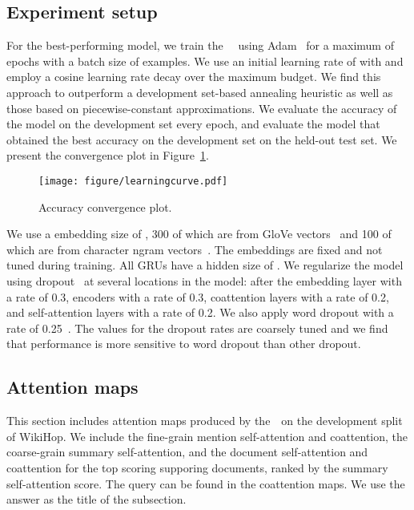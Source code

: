 \documentclass{article} \usepackage{iclr2019_conference,times}
\begin{document}
\subsection{Experiment setup}
\label{appendix:setup}
For the best-performing model, we train the ~\modelnameshort~using Adam~\citep{Kingma2015AdamAM} for a maximum of  epochs with a batch size of  examples. 
We use an initial learning rate of  with  and employ a cosine learning rate decay \cite{Loshchilov2017SGDR} over the maximum budget.
We find this approach to outperform a development set-based annealing heuristic as well as those based on piecewise-constant approximations.
We evaluate the accuracy of the model on the development set every epoch, and evaluate the model that obtained the best accuracy on the development set on the held-out test set.
We present the convergence plot in Figure~\ref{eq:learningcurve}. 

\begin{figure}[!h]
\centering
  \texttt{[image: figure/learningcurve.pdf]}
  \caption{Accuracy convergence plot.}
  \label{eq:learningcurve}
\end{figure}


We use a embedding size of , 300 of which are from GloVe vectors~\citep{Pennington2014GloveGV} and 100 of which are from character ngram vectors~\citep{Hashimoto2017AJM}.
The embeddings are fixed and not tuned during training.
All GRUs have a hidden size of .
We regularize the model using dropout~\citep{JMLR:v15:srivastava14a} at several locations in the model: after the embedding layer with a rate of 0.3, encoders with a rate of 0.3, coattention layers with a rate of 0.2, and self-attention layers with a rate of 0.2.
We also apply word dropout with a rate of 0.25~\citep{zhang2017position,zhong2018global}.
The values for the dropout rates are coarsely tuned and we find that performance is more sensitive to word dropout than other dropout. 





\subsection{Attention maps}
\label{appendix:attentionmap}
This section includes attention maps produced by the~\modelnameshort~on the development split of WikiHop.
We include the fine-grain mention self-attention and coattention, the coarse-grain summary self-attention, and the document self-attention and coattention for the top scoring supporing documents, ranked by the summary self-attention score.
The query can be found in the coattention maps.
We use the answer as the title of the subsection.
\end{document}
